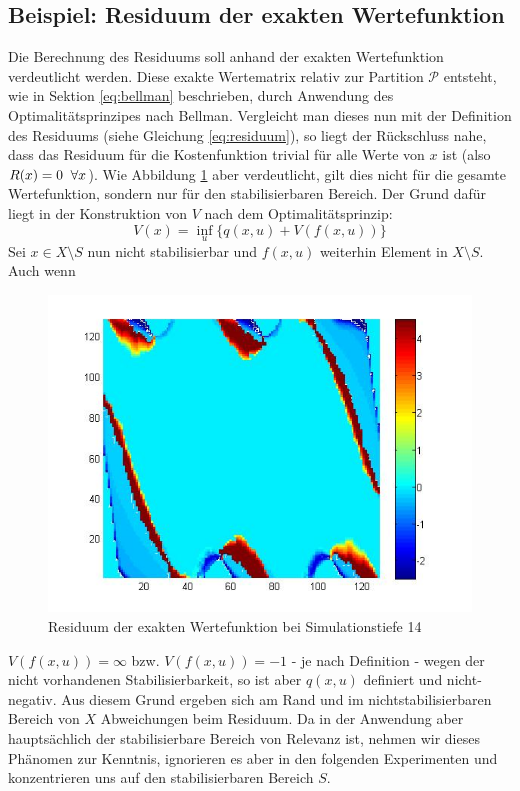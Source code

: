 \documentclass[12pt,a4paper,twoside]{article}
\begin{document}
	\subsection{Beispiel: Residuum der exakten Wertefunktion}
	Die Berechnung des Residuums soll anhand der exakten Wertefunktion verdeutlicht werden. Diese exakte Wertematrix 
	relativ zur Partition $\mathcal{P}$ entsteht, wie in Sektion \ref{eq:bellman} beschrieben, durch Anwendung des 
	Optimalitätsprinzipes nach Bellman. Vergleicht man dieses nun mit der Definition des Residuums (siehe Gleichung 
	\ref{eq:residuum}), so liegt der Rückschluss nahe, dass das Residuum für die Kostenfunktion trivial für alle Werte von $x$ ist (also $R(x)=0 \hspace{2mm}\forall x$). Wie Abbildung \ref{pic:res_exakt} aber verdeutlicht, gilt dies nicht 
	für die gesamte Wertefunktion, sondern nur für den stabilisierbaren Bereich. Der Grund dafür liegt in der 
	Konstruktion von $V$ nach dem Optimalitätsprinzip:
	\begin{equation*}
		V(x)=\inf_{u}\{q(x,u)+V(f(x,u))\}
	\end{equation*}
	Sei $x\in X\setminus S$ nun nicht stabilisierbar und $f(x,u)$ weiterhin Element in $X\setminus S$. Auch wenn 
	\begin{figure}[h]
	\center
		\includegraphics[scale=0.4]{Residuum_exactV_depth14.jpg}
		\caption{\label{pic:res_exakt}Residuum der exakten Wertefunktion bei Simulationstiefe 14}
	\end{figure}
	$V(f(x,u))=\infty$ bzw. $V(f(x,u))=-1$ - je nach Definition - wegen der nicht vorhandenen Stabilisierbarkeit, so ist aber $q(x,u)$ definiert und nicht-negativ. Aus diesem Grund ergeben sich 
	am Rand und im nichtstabilisierbaren Bereich von $X$ Abweichungen beim Residuum. Da in der Anwendung aber 
	hauptsächlich der stabilisierbare Bereich von Relevanz ist, nehmen wir dieses Phänomen zur Kenntnis, ignorieren 
	es aber in den folgenden Experimenten und konzentrieren uns auf den stabilisierbaren Bereich $S$.
	\newpage
\end{document}
